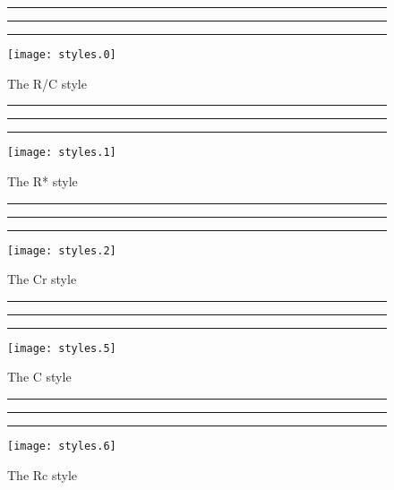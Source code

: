 
%
%

\begin{figure}
\hrule\vspace*{-0.55ex}
\caption{The R/C style}\label{fig:s0}
\vspace*{0.35ex}\hrule\vspace*{0.25ex}\hrule
\centering
\texttt{[image: styles.0]}
\end{figure}

\begin{figure}
\hrule\vspace*{-0.25ex}
\caption{The R* style}\label{fig:s1}
\vspace*{0.35ex}\hrule\vspace*{0.25ex}\hrule
\centering
\texttt{[image: styles.1]}
\end{figure}

\begin{figure}
\hrule\vspace*{-0.25ex}
\caption{The Cr style}\label{fig:s2}
\vspace*{0.35ex}\hrule\vspace*{0.25ex}\hrule
\centering
\texttt{[image: styles.2]}
\end{figure}

\begin{figure}
\hrule\vspace*{-0.25ex}
\caption{The C style}\label{fig:s5}
\vspace*{0.35ex}\hrule\vspace*{0.25ex}\hrule
\centering
\texttt{[image: styles.5]}
\end{figure}

\begin{figure}
\hrule\vspace*{-0.25ex}
\caption{The Rc style}\label{fig:s6}
\vspace*{0.35ex}\hrule\vspace*{0.25ex}\hrule
\centering
\texttt{[image: styles.6]}
\end{figure}

